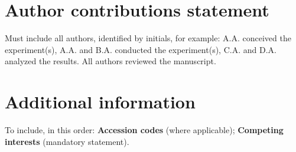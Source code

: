 \documentclass[fleqn,10pt]{wlscirep}
\begin{document}
\section*{Author contributions statement}

Must include all authors, identified by initials, for example:
A.A. conceived the experiment(s),  A.A. and B.A. conducted the experiment(s), C.A. and D.A. analyzed the results.  All authors reviewed the manuscript. 

\section*{Additional information}

To include, in this order: \textbf{Accession codes} (where applicable); \textbf{Competing interests} (mandatory statement). 
\end{document}
